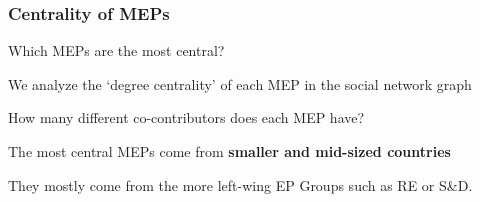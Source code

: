 \documentclass{beamer}
\begin{document}
\begin{frame}
	\frametitle{Centrality of MEPs}
	Which MEPs are the most central?
	
	\pause We analyze the `degree centrality' of each MEP in the social network graph
	
	\pause How many different co-contributors does each MEP have?
	
	\vspace{0.3cm}
	
	
	\vspace{0.3cm}
	
	\pause The most central MEPs come from \textbf{smaller and mid-sized countries}
	
	\pause They mostly come from the more left-wing EP Groups such as RE or S\&D.
	
\end{frame}
\end{document}
